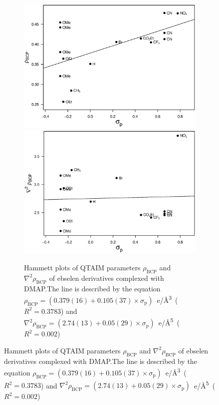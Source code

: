 \begin{refsection}
\begin{figure}
\centering
\begin{subfigure}{\linewidth}
  \centering
  \includegraphics[width=0.45\linewidth]{Figures/hammett-rho-dmap-p.eps}
  \includegraphics[width=0.45\linewidth]{Figures/hammett-lapl-dmap-p.eps}
  \caption[Hammett plots of QTAIM parameters $\rho_\text{BCP}$ and $\nabla^2\rho_{\text{BCP}}$ of ebselen derivatives complexed with DMAP.]{Hammett plots of QTAIM parameters $\rho_\text{BCP}$ and $\nabla^2\rho_{\text{BCP}}$ of ebselen derivatives complexed with DMAP.\@ The line is described by the equation $\rho_{\text{BCP}} = (0.379(16) + 0.105(37) \times \sigma_\text{p})$~e/\AA\textsuperscript{3}~($R^2=0.3783$) and $\nabla^2\rho_{\text{BCP}} = (2.74(13) + 0.05(29) \times \sigma_\text{p})$~e/\AA\textsuperscript{5}~($R^2=0.002$)}\label{fig:hammett-qtaim-dmap}
\end{subfigure}


\end{figure}
\end{refsection}
